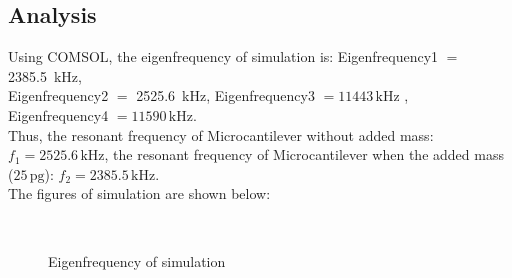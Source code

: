 \documentclass[a4paper,12pt,reqno]{report}
\begin{document}
    \newpage

    \subsection{Analysis}
    \label{sec:Analysis}
        Using COMSOL, the eigenfrequency of simulation is: Eigenfrequency1 $=$ \qty{2385.5}{\kHz},\\
        Eigenfrequency2  $=$ \qty{2525.6}{\kHz}, Eigenfrequency3 $=11443\,\unit{\kHz}$ , Eigenfrequency4 $=11590\,\unit{\kHz}$.\\
        Thus, the resonant frequency of Microcantilever without added mass: $f_1=2525.6\,\unit{\kHz}$, 
        the resonant frequency of Microcantilever when the added mass ($25\,\unit{\pg}$): $f_2=2385.5\,\unit{\kHz}$.\\
        The figures of simulation are shown below:
        \begin{figure}[H]
            \centering
            \vspace{-0.35cm}
            \subfigtopskip=2pt
            \subfigbottomskip=2pt
            \subfigcapskip=-5pt
            \quad
            \\
            \quad
            \caption{Eigenfrequency of simulation}
            \label{Eigenfrequency}
        \end{figure}
\end{document}
